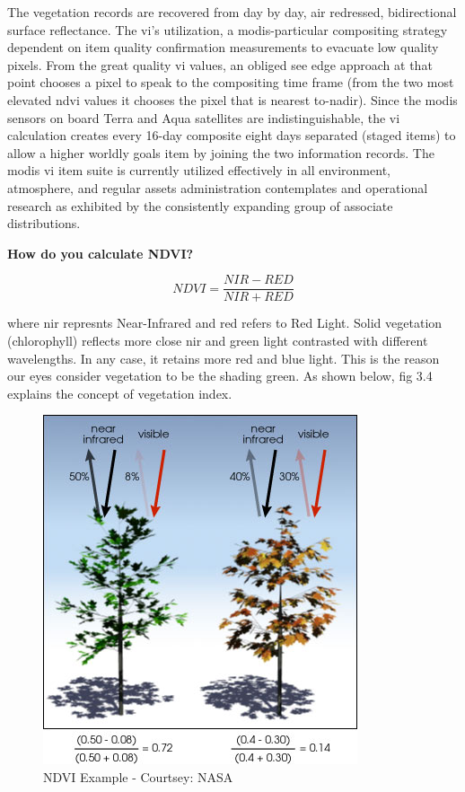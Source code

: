The vegetation records are recovered from day by day, air redressed, bidirectional surface reflectance. The \gls{vi}'s utilization, a \gls{modis}-particular compositing strategy dependent on item quality confirmation measurements to evacuate low quality pixels. From the great quality \gls{vi} values, an obliged see edge approach at that point chooses a pixel to speak to the compositing time frame (from the two most elevated \gls{ndvi} values it chooses the pixel that is nearest to-nadir). Since the \gls{modis} sensors on board Terra and Aqua satellites are indistinguishable, the \gls{vi} calculation creates every 16-day composite eight days separated (staged items) to allow a higher worldly goals item by joining the two information records. The \gls{modis} \gls{vi} item suite is currently utilized effectively in all environment, atmosphere, and regular assets administration contemplates and operational research as exhibited by the consistently expanding group of associate distributions. \\

\centerline{\textbf{How do you calculate NDVI?  \cite{theGISGeography}}}

  \begin{equation} \label{eq:ndvi_formula}
       NDVI = \frac{NIR - RED}{NIR + RED}
    \end{equation} 


where \gls{nir} represnts Near-Infrared and \gls{red} refers to Red Light. Solid vegetation (chlorophyll) reflects more close \gls{nir} and green light contrasted with different wavelengths. In any case, it retains more red and blue light. This is the reason our eyes consider vegetation to be the shading green. As shown below, fig 3.4 explains the concept of vegetation index.

    \begin{figure}[H]
            \centering
            \includegraphics[width=0.5\linewidth]{figures/ch3/ndvi-example.png}
            \caption{\label{fig:ndvi_example} NDVI Example - Courtsey: NASA \cite{MODIS}}
    \end{figure}

